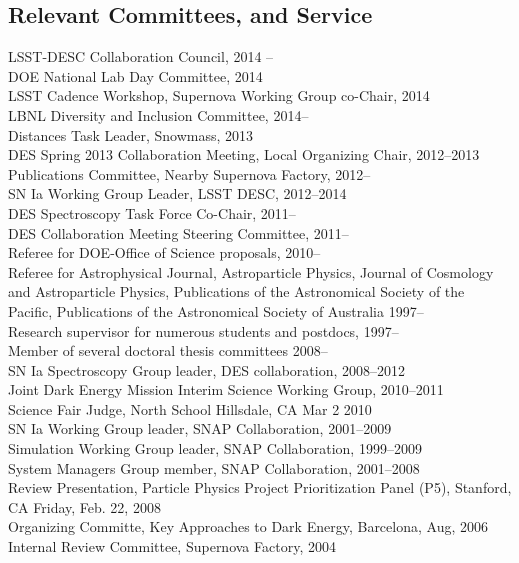 \documentclass[line, margin]{res}
\begin{document}
\begin{resume}
\section{Relevant Committees, and Service}
LSST-DESC Collaboration Council, 2014 --\\
DOE National Lab Day Committee, 2014\\
LSST Cadence Workshop, Supernova Working Group co-Chair, 2014\\
LBNL Diversity and Inclusion Committee, 2014--\\
Distances Task Leader, Snowmass, 2013\\
DES Spring 2013 Collaboration Meeting, Local Organizing Chair, 2012--2013\\
Publications Committee, Nearby Supernova Factory, 2012--\\
SN Ia Working Group Leader, LSST DESC, 2012--2014\\
DES Spectroscopy Task Force Co-Chair, 2011--\\
DES Collaboration Meeting Steering Committee, 2011--\\
Referee for DOE-Office of Science proposals, 2010-- \\
Referee for Astrophysical Journal, Astroparticle Physics, Journal of Cosmology and Astroparticle Physics, Publications of the Astronomical Society of the Pacific, Publications of the Astronomical Society of Australia 1997--\\
Research supervisor for numerous students and postdocs, 1997--\\
Member of several doctoral thesis committees 2008--\\
SN Ia Spectroscopy Group leader, DES collaboration, 2008--2012\\
Joint Dark Energy Mission Interim Science Working Group, 2010--2011\\
Science Fair Judge, North School Hillsdale, CA Mar 2 2010\\
SN Ia Working Group leader, SNAP Collaboration, 2001--2009\\
Simulation Working Group leader, SNAP Collaboration, 1999--2009\\
System Managers Group member, SNAP Collaboration, 2001--2008\\
Review Presentation, Particle Physics Project Prioritization Panel (P5), Stanford, CA Friday, Feb. 22, 2008\\
Organizing Committe, Key Approaches to Dark Energy, Barcelona,  Aug, 2006\\
Internal Review Committee, Supernova Factory, 2004


\end{resume}
\end{document}
